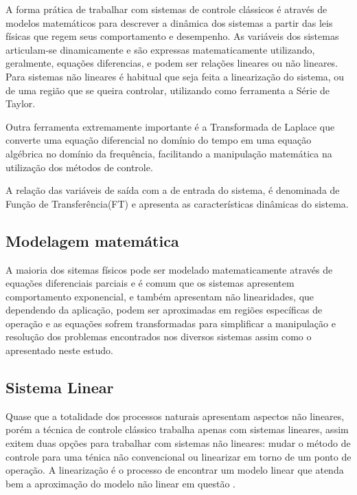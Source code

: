 A forma prática de trabalhar com sistemas de controle clássicos é através de modelos matemáticos para descrever a dinâmica dos sistemas a partir das leis físicas que regem seus comportamento e desempenho.
As variáveis dos sistemas articulam-se dinamicamente e são expressas matematicamente utilizando, geralmente, equações diferencias, e podem ser relações lineares ou não lineares. Para sistemas não lineares é habitual que seja feita a linearização do sistema, ou de uma região que se queira controlar, utilizando como ferramenta a Série de Taylor. 

Outra ferramenta extremamente importante é a Transformada de Laplace que converte uma equação diferencial no domínio do tempo em uma equação algébrica no domínio da frequência, facilitando a manipulação matemática na utilização dos métodos de controle. 

A relação das variáveis de saída com a de entrada do sistema, é denominada de Função de Transferência(FT) e apresenta as características dinâmicas do sistema.



\subsection{Modelagem matemática}

A maioria dos sitemas físicos pode ser modelado matematicamente através de equações diferenciais parciais e é comum que os sistemas apresentem comportamento exponencial, e também apresentam não linearidades, que dependendo da aplicação, podem ser aproximadas em regiões específicas de operação e as equações sofrem transformadas para simplificar a manipulação e resolução dos problemas encontrados nos diversos sistemas assim como o apresentado neste estudo.


\subsection{Sistema Linear}

Quase que a totalidade dos processos naturais apresentam aspectos não lineares, porém a técnica de controle clássico trabalha apenas com sistemas lineares, assim exitem duas opções para trabalhar com sistemas não lineares: mudar o método de controle para uma ténica não convencional ou linearizar em torno de um ponto de operação. A linearização é o processo de encontrar um modelo linear que atenda bem a aproximação do modelo não linear em questão \cite{Ogata}.

